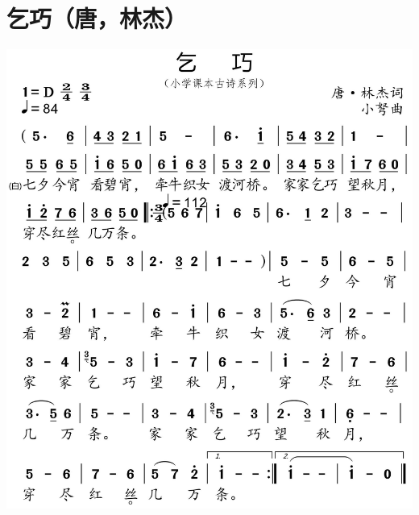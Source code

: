\documentclass[cn,pad,chinesefont=nofont]{elegantbook}
\begin{document}
\section{乞巧（唐，林杰）}
    \includegraphics[width=\textwidth]{dongxiao/20200627-古诗-乞巧.jpg}     
\end{document}

